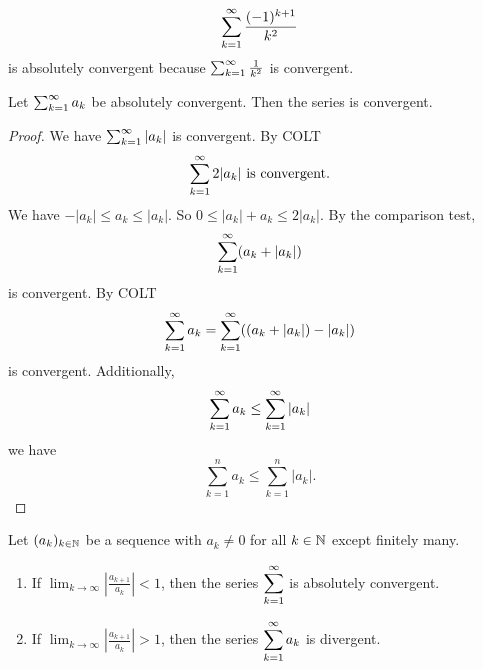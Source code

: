 \documentclass[10pt, a4paper]{article}
\newcommand{\dseq}[2][n]{(#2_#1)_{#1 \in \N}}
\begin{document}
\begin{example}
    \[
    \infsum[k = 1]\frac{(-1) ^ {k + 1}}{k ^ 2}
    \]
    is absolutely convergent because $\infsum[k = 1]\frac{1}{k ^ 2}$ is convergent.
\end{example}

\begin{theorem}
    Let $\infsum[k = 1]a_k$ be absolutely convergent.
    Then the series is convergent.
    \begin{proof}
        We have $\infsum[k = 1]|a_k|$ is convergent.
        By COLT
        \[
        \infsum[k = 1]2|a_k|\text{ is convergent}.
        \]
        We have $-|a_k| \leq a_k \leq |a_k|$.
        So $0 \leq |a_k| + a_k \leq 2|a_k|$.
        By the comparison test,
        \[
        \infsum[k = 1](a_k + |a_k|)
        \]
        is convergent.
        By COLT
        \[
        \infsum[k = 1]a_k = \infsum[k = 1]((a_k + |a_k|) - |a_k|)
        \]
        is convergent.
        Additionally,
        \[
        \infsum[k = 1]a_k \leq \infsum[k = 1]|a_k|
        \]
        we have
        \[
        \sum_{k = 1}^{n}a_k \leq \sum_{k = 1}^{n}|a_k|.
        \]
    \end{proof}
\end{theorem}

\begin{theorem}
    Let $\dseq[k]{a}$ be a sequence with $a_k \neq 0$ for all $k \in \N$ except finitely many.
    \begin{enumerate}[label = (\alph*)]
        \item If $\displaystyle\lim_{k \rightarrow \infty}\left|\frac{a_{k + 1}}{a_k}\right| < 1$,
        then the series $\displaystyle\infsum[k = 1]$ is absolutely convergent.
        \item If $\displaystyle\lim_{k \rightarrow \infty}\left|\frac{a_{k + 1}}{a_k}\right| > 1$,
        then the series $\displaystyle\infsum[k = 1]a_k$ is divergent.
    \end{enumerate}
\end{theorem}
\end{document}

